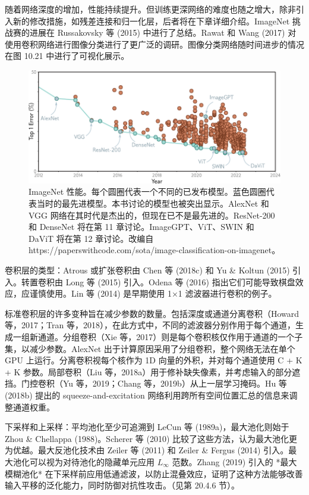 \documentclass[lang=cn,newtx,10pt,scheme=chinese]{elegantbook}
\begin{document}
随着网络深度的增加，性能持续提升。但训练更深网络的难度也随之增大，除非引入新的修改措施，如残差连接和归一化层，后者将在下章详细介绍。ImageNet 挑战赛的进展在 Russakovsky 等 (2015) 中进行了总结。Rawat 和 Wang (2017) 对使用卷积网络进行图像分类进行了更广泛的调研。图像分类网络随时间进步的情况在图 10.21 中进行了可视化展示。

\begin{figure}[ht!]
	\centering
	\includegraphics[width=0.7\linewidth]{PDFFigures/UDLChap10PDF/ConvImageNetPerformance.pdf}
	\caption{ImageNet 性能。每个圆圈代表一个不同的已发布模型。蓝色圆圈代表当时的最先进模型。本书讨论的模型也被突出显示。AlexNet 和 VGG 网络在其时代是杰出的，但现在已不是最先进的。ResNet-200 和 DenseNet 将在第 11 章讨论。ImageGPT、ViT、SWIN 和 DaViT 将在第 12 章讨论。改编自 https://paperswithcode.com/sota/image-classification-on-imagenet。}
\end{figure}

卷积层的类型：Atrous 或扩张卷积由 Chen 等 (2018c) 和 Yu \& Koltun (2015) 引入。转置卷积由 Long 等 (2015) 引入。Odena 等 (2016) 指出它们可能导致棋盘效应，应谨慎使用。Lin 等 (2014) 是早期使用 1×1 滤波器进行卷积的例子。

标准卷积层的许多变种旨在减少参数的数量。包括深度或通道分离卷积（Howard 等，2017；Tran 等，2018），在此方式中，不同的滤波器分别作用于每个通道，生成一组新通道。分组卷积（Xie 等，2017）则是每个卷积核仅作用于通道的一个子集，以减少参数。AlexNet 出于计算原因采用了分组卷积，整个网络无法在单个 GPU 上运行。分离卷积视每个核作为 1D 向量的外积，并对每个通道使用 C + K + K 参数。局部卷积（Liu 等，2018a）用于修补缺失像素，并考虑输入的部分遮挡。门控卷积（Yu 等，2019；Chang 等，2019b）从上一层学习掩码。Hu 等 (2018b) 提出的 squeeze-and-excitation 网络利用跨所有空间位置汇总的信息来调整通道权重。

下采样和上采样：平均池化至少可追溯到 LeCun 等 (1989a)，最大池化则始于 Zhou \& Chellappa (1988)。Scherer 等 (2010) 比较了这些方法，认为最大池化更为优越。最大反池化技术由 Zeiler 等 (2011) 和 Zeiler \& Fergus (2014) 引入。最大池化可以视为对待池化的隐藏单元应用 \(L_{\infty}\) 范数。Zhang (2019) 引入的 *最大模糊池化* 在下采样前应用低通滤波，以防止混叠效应，证明了这种方法能够改善输入平移的泛化能力，同时防御对抗性攻击。（见第 20.4.6 节）。
\end{document}
